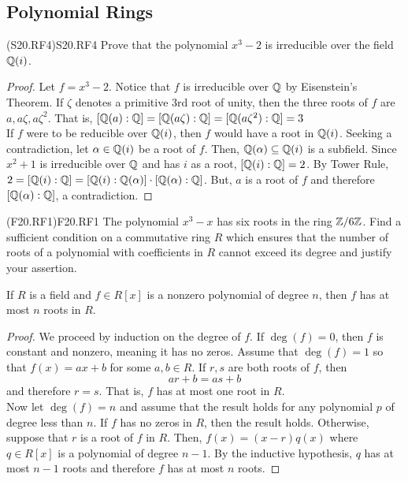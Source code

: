 \documentclass[../../AlgebraQualSolutions.tex]{subfiles}
\begin{document}
\subsection{Polynomial Rings}

\begin{prob}{(S20.RF4)}{S20.RF4}
    Prove that the polynomial $x^3 - 2$ is irreducible over the field $\mathbb{Q}(i)$.
\end{prob}

\begin{proof}
    Let $f = x^3 - 2$. Notice that $f$ is irreducible over $\mathbb{Q}$ by Eisenstein's Theorem. If $\zeta$ denotes a primitive 3rd root of unity, then the three roots of $f$ are $a,a\zeta, a\zeta^2$. That is, $[\mathbb{Q}(a): \mathbb{Q}] = [\mathbb{Q}(a\zeta): \mathbb{Q}] = [\mathbb{Q}(a\zeta^2): \mathbb{Q}] = 3$\\
    
    If $f$ were to be reducible over $\mathbb{Q}(i)$, then $f$ would have a root in $\mathbb{Q}(i)$. Seeking a contradiction, let $\alpha \in \mathbb{Q}(i)$ be a root of $f$. Then, $\mathbb{Q}(\alpha) \subseteq \mathbb{Q}(i)$ is a subfield. Since $x^2 + 1$ is irreducible over $\mathbb{Q}$ and has $i$ as a root, $[\mathbb{Q}(i): \mathbb{Q}] = 2$. By Tower Rule, $2 = [\mathbb{Q}(i): \mathbb{Q}] = [\mathbb{Q}(i): \mathbb{Q}(\alpha)]\cdot[\mathbb{Q}(\alpha): \mathbb{Q}]$. But, $a$ is a root of $f$ and therefore $[\mathbb{Q}(\alpha): \mathbb{Q}]$, a contradiction.
\end{proof}

\begin{prob}{(F20.RF1)}{F20.RF1}
    The polynomial $x^3 - x$ has six roots in the ring $\mathbb{Z}/6\mathbb{Z}$. Find a sufficient condition on a commutative ring $R$ which ensures that the number of roots of a polynomial with coefficients in $R$ cannot exceed its degree and justify your assertion.
    \end{prob}
    
    \begin{claim}
        If $R$ is a field and $f \in R[x]$ is a nonzero polynomial of degree $n$, then $f$ has at most $n$ roots in $R$.
    
        \begin{proof}
            We proceed by induction on the degree of $f$. If $\deg(f) = 0$, then $f$ is constant and nonzero, meaning it has no zeros. Assume that $\deg(f) = 1$ so that $f(x) = ax + b$ for some $a,b \in R$. If $r,s$ are both roots of $f$, then
                \[ar + b = as + b\]
            and therefore $r = s$. That is, $f$ has at most one root in $R$.\\
            
            Now let $\deg(f) = n$ and assume that the result holds for any polynomial $p$ of degree less than $n$. If $f$ has no zeros in $R$, then the result holds. Otherwise, suppose that $r$ is a root of $f$ in $R$. Then, $f(x) = (x - r)q(x)$ where $q \in R[x]$ is a polynomial of degree $n - 1$. By the inductive hypothesis, $q$ has at most $n - 1$ roots and therefore $f$ has at most $n$ roots.
        \end{proof}
    \end{claim}
\end{document}
